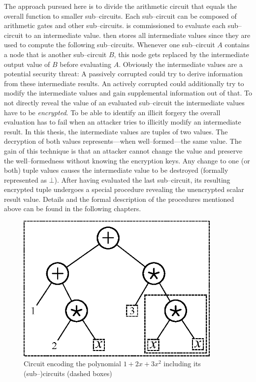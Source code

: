 The approach pursued here is to divide the arithmetic circuit that equals the
overall function to smaller sub--circuits. Each sub--circuit can be composed of
arithmetic gates and other sub--circuits. \JWpTwo{} is commissioned to evaluate
each sub--circuit to an intermediate value. \JWpTwo{} then stores all
intermediate values since they are used to compute the following sub--circuits.
Whenever one sub--circuit $A$ contains a node that is another sub--circuit $B$,
this node gets replaced by the intermediate output value of $B$ before
evaluating $A$.  Obviously the intermediate values are a potential security
threat: A passively corrupted \JWpTwo{} could try to derive information from
these intermediate results. An actively corrupted \JWpTwo{} could additionally
try to modify the intermediate values and gain supplemental information out of
that. To not directly reveal the value of an evaluated sub--circuit the
intermediate values have to be \emph{encrypted}. To be able to identify an
illicit forgery the overall evaluation has to fail when an attacker tries to
illicitly modify an intermediate result. In this thesis, the intermediate values
are tuples of two values. The decryption of both values represents---when
well--formed---the same value. The gain of this technique is that an attacker
cannot change the value and preserve the well--formedness without knowing the
encryption keys. Any change to one (or both) tuple values causes the
intermediate value to be destroyed (formally represented as $\bot$). After
having evaluated the last sub--circuit, its resulting encrypted tuple undergoes
a special procedure revealing the unencrypted scalar result value. Details and
the formal description of the procedures mentioned above can be found in the
following chapters.

\begin{figure}[htb]
  \centering
  \includegraphics[width=10cm]{images/sample-polynomial.eps}
  \caption{Circuit encoding the polynomial $1 + 2x + 3x^2$ including its
    (sub--)circuits (dashed boxes)}
  \label{fig:sample-poly}
\end{figure}


